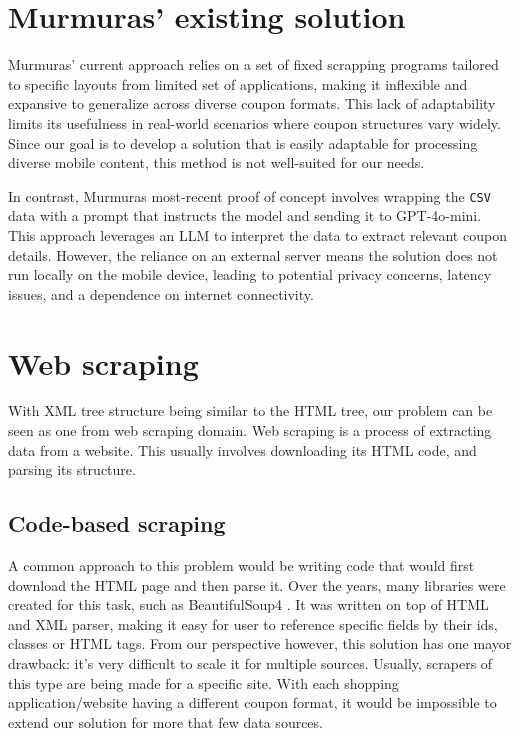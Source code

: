 \documentclass[licencjacka,en]{pracamgr}
\begin{document}
\section{Murmuras' existing solution} 
Murmuras' current approach relies on a set of fixed scrapping programs tailored to specific layouts from limited set of applications, making it inflexible and expansive to generalize across diverse coupon formats. This lack of adaptability limits its usefulness in real-world scenarios where coupon structures vary widely. Since our goal is to develop a solution that is easily adaptable for processing diverse mobile content, this method is not well-suited for our needs.

In contrast, Murmuras most-recent proof of concept involves wrapping the \texttt{CSV} data with a prompt that instructs the model and sending it to GPT-4o-mini. This approach leverages an LLM to interpret the data to extract relevant coupon details. However, the reliance on an external server means the solution does not run locally on the mobile device, leading to potential privacy concerns, latency issues, and a dependence on internet connectivity. 

\section{Web scraping}
With XML tree structure being similar to the HTML tree, our problem can be seen as one from web scraping domain. Web scraping \cite{WS} is a process of extracting data from a website. This usually involves downloading its HTML code, and parsing its structure.

\subsection{Code-based scraping}
A common approach to this problem would be writing code that would first download the HTML page and then parse it. Over the years, many libraries were created for this task, such as BeautifulSoup4 \cite{zupa}. It was written on top of HTML and XML parser, making it easy for user to reference specific fields by their ids, classes or HTML tags. From our perspective however, this solution has one mayor drawback: it's very difficult to scale it for multiple sources. Usually, scrapers of this type are being made for a specific site. With each shopping application/website having a different coupon format, it would be impossible to extend our solution for more that few data sources.
\end{document}
